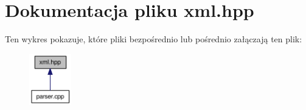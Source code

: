 \hypertarget{a00018}{
\section{Dokumentacja pliku xml.hpp}
\label{d1/d2b/a00018}
}


Ten wykres pokazuje, które pliki bezpośrednio lub pośrednio załączają ten plik:\nopagebreak
\begin{figure}[H]
\begin{center}
\leavevmode
\includegraphics[width=52pt]{d2/d79/a00051}
\end{center}
\end{figure}
